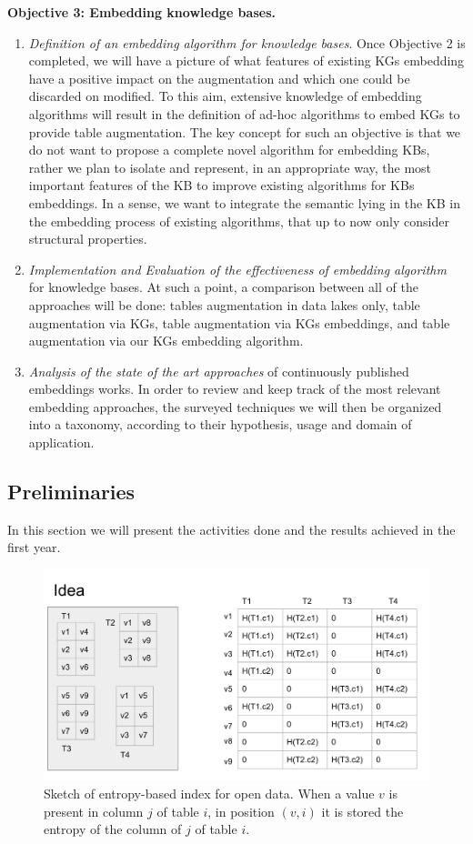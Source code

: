 \noindent\textbf{Objective 3: Embedding knowledge bases.}
\begin{enumerate}
    \item \textit{Definition of an embedding algorithm for knowledge bases}. Once Objective 2 is completed, we will have a picture of what features of existing KGs embedding have a positive impact on the augmentation and which one could be discarded on modified. To this aim, extensive knowledge of embedding algorithms will result in the definition of ad-hoc algorithms to embed KGs to provide table augmentation. The key concept for such an objective is that we do not want to propose a complete novel algorithm for embedding KBs, rather we plan to isolate and represent, in an appropriate way, the most important features of the KB to improve existing algorithms for KBs embeddings. In a sense, we want to integrate the semantic lying in the KB in the embedding process of existing algorithms, that up to now only consider structural properties.
    \item \textit{Implementation and Evaluation of the effectiveness of embedding algorithm} for knowledge bases. At such a point, a comparison between all of the approaches will be done: tables augmentation in data lakes only, table augmentation via KGs, table augmentation via KGs embeddings, and table augmentation via our KGs embedding algorithm.
    \item  \textit{Analysis of the state of the art approaches} of continuously published embeddings works. In order to review and keep track of the most relevant embedding approaches, the surveyed techniques we will then be organized into a taxonomy, according to their hypothesis, usage and domain of application.
\end{enumerate}



\subsection{Preliminaries}\label{sub_preliminaries}
In this section we will present the activities done and the results achieved in the first year.

\begin{figure}[t]\label{index_sketch}
    \includegraphics[scale=0.4]{figures/index_sketch.png}
    \caption{Sketch of entropy-based index for open data. When a value $v$ is present in column $j$ of table $i$, in position $(v,i)$ it is stored the entropy of the column of $j$ of table $i$.}
\end{figure}


